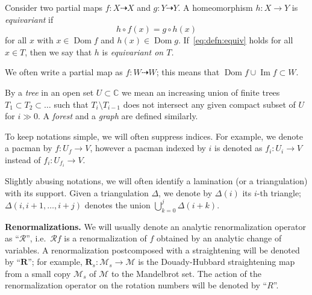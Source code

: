 \documentclass{amsart}
\newcommand{\Dom}{\operatorname {Dom}}
\newcommand{\1}{{\mathbb 1 }}
\renewcommand{\Im}{\operatorname {Im}}
\newcommand{\Mandel}{{\mathcal{M}}}
\newcommand{\bDelta}{{\mathbb{\Delta}}}
\newcommand\RR{\mathcal{R}}
\newcommand\cRR{R}%
\newcommand\mRR{\boldsymbol R}%
\newcommand{\C}{\mathbb{C}}
\theoremstyle{remark}
\numberwithin{equation}{section}
\theoremstyle{definition}
\theoremstyle{nonumberbreak}
\begin{document}
Consider two partial maps $f\colon  X\dashrightarrow X$ and $g\colon Y\dashrightarrow Y$. A  homeomorphism $h\colon X\to Y$ is \emph{equivariant} if 
\begin{equation}
\label{eq:defn:equiv}
 h\circ f(x)=g\circ h (x)
 \end{equation}
for all $x$ with $x\in \Dom f$ and $h(x)\in \Dom g$. If~\eqref{eq:defn:equiv} holds for all $x\in T$, then we say that $h$ is \emph{equivariant on $T$.} 

We often write a partial map as $f\colon W\dashrightarrow W$; this means that $\Dom f\cup \Im f \subset W$. 


By a \emph{tree} in an open set $U\subset  \C$ we mean an increasing union of finite trees $T_1\subset T_2\subset\dots $ such that $T_i\setminus T_{i-1}$ does not intersect any given compact subset of $U$ for $i\gg0$. A \emph{forest} and a \emph{graph} are defined similarly.


To keep notations simple, we will often suppress indices. For example, we denote
a pacman by $f\colon U_f \to V$, however a pacman indexed by $i$ is denoted as $f_i\colon U_i\to V$ instead of $f_i\colon U_{f_i}\to V$. 

Slightly abusing notations, we will often identify a lamination (or a triangulation) with its support. Given a triangulation $\bDelta$, we denote by $\Delta(i)$ its $i$-th triangle; $\Delta(i,i+1,\dots, i+j)$ denotes the union $\displaystyle \bigcup_{k=0}^j\Delta(i+k)$.



{\bf Renormalizations.} We will usually denote an analytic renormalization operator as ``$\RR$'', i.e.~$\RR f$ is a renormalization of $f$ obtained by an analytic change of variables. A renormalization postcomposed with a straightening will be denoted by ``$\mRR$''; for example, $\mRR_{s} \colon \Mandel_s\to \Mandel$ is the Douady-Hubbard straightening map from a small copy $\Mandel_s$ of $\Mandel$ to the Mandelbrot set. The action of the renormalization operator on the rotation numbers will be denoted by ``$\cRR$''.
\end{document}
